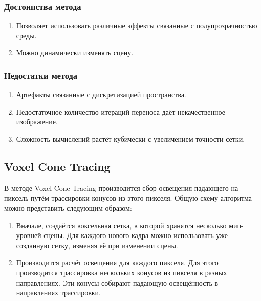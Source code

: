 \documentclass[12pt,fleqn]{article}
\begin{document}
\subsubsection{Достоинства метода}

\begin{enumerate}

\item Позволяет использовать различные эффекты связанные с полупрозрачностью среды.

\item Можно динамически изменять сцену.

\end{enumerate}

\subsubsection{Недостатки метода}

\begin{enumerate}

\item Артефакты связанные с дискретизацией пространства.

\item Недостаточное количество итераций переноса даёт некачественное изображение.

\item Сложность вычислений растёт кубически с увеличением точности сетки.

\end{enumerate}

\subsection{Voxel Cone Tracing}

В методе Voxel Cone Tracing \cite{VoxelConeTracing} производится сбор освещения падающего на пиксель путём трассировки конусов из этого пикселя. Общую схему алгоритма можно представить следующим образом:

\begin{enumerate}

\item Вначале, создаётся воксельная сетка, в которой хранятся несколько мип-уровней сцены. Для каждого нового кадра можно использовать уже созданную сетку, изменяя её при изменении сцены.

\item Производится расчёт освещения для каждого пикселя. Для этого производится трассировка нескольких конусов из пикселя в разных направлениях. Эти конусы собирают падающую освещённость в направлениях трассировки.

\end{enumerate}
\end{document}
